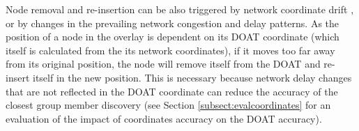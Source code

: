 Node removal and re-insertion can be also triggered by network coordinate
drift \cite{wild}, or by changes in the prevailing network congestion and
delay patterns. As the position of a node in the overlay is dependent on
its DOAT coordinate (which itself is calculated from the its network
coordinates), if it moves too far away from its original position, the node
will remove itself from the DOAT and re-insert itself in the new position.
This is necessary because network delay changes that are not reflected in the
DOAT coordinate can reduce the accuracy of the closest group
member discovery (see Section \ref{subsect:evalcoordinates} for an evaluation of the
impact of coordinates accuracy on the DOAT accuracy).